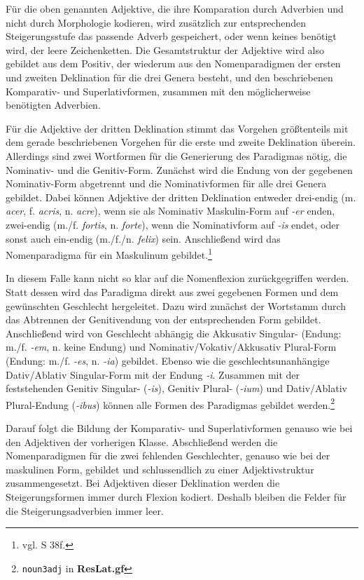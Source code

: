 Für die oben genannten Adjektive, die ihre Komparation durch Adverbien und nicht durch Morphologie kodieren, wird zusätzlich zur entsprechenden Steigerungsstufe das passende Adverb gespeichert, oder wenn keines benötigt wird, der leere Zeichenketten. Die Gesamtstruktur der Adjektive wird also gebildet aus dem Positiv, der wiederum aus den Nomenparadigmen der ersten und zweiten Deklination für die drei Genera besteht, und den beschriebenen Komparativ- und Superlativformen, zusammen mit den möglicherweise benötigten Adverbien.\par
Für die Adjektive der dritten Deklination stimmt das Vorgehen größtenteils mit dem gerade beschriebenen Vorgehen für die erste und zweite Deklination überein. Allerdings sind zwei Wortformen für die Generierung des Paradigmas nötig, die Nominativ- und die Genitiv-Form. Zunächst wird die Endung von der gegebenen Nominativ-Form abgetrennt und die Nominativformen für alle drei Genera gebildet. Dabei können Adjektive der dritten Deklination entweder drei-endig (m. \textit{acer}, f. \textit{acris}, n. \textit{acre}), wenn sie als Nominativ Maskulin-Form auf \textit{-er} enden, zwei-endig (m./f. \textit{fortis}, n. \textit{forte}), wenn die Nominativform auf \textit{-is} endet, oder sonst auch ein-endig (m./f./n. \textit{felix}) sein. Anschließend wird das Nomenparadigma für ein Maskulinum gebildet.\footnote{vgl. \cite{BAYER-LINDAUER1994} S 38f.} \par
In diesem Falle kann nicht so klar auf die Nomenflexion zurückgegriffen werden. Statt dessen wird das Paradigma direkt aus zwei gegebenen Formen und dem gewünschten Geschlecht hergeleitet. Dazu wird zunächst der Wortstamm durch das Abtrennen der Genitivendung von der entsprechenden Form gebildet. Anschließend wird von Geschlecht abhängig die Akkusativ Singular- (Endung: m./f. \textit{-em}, n. keine Endung) und Nominativ/Vokativ/Akkusativ Plural-Form (Endung: m./f. \textit{-es}, n. \textit{-ia}) gebildet. Ebenso wie die geschlechtsunanhängige Dativ/Ablativ Singular-Form mit der Endung \textit{-i}. Zusammen mit der feststehenden Genitiv Singular- (\textit{-is}), Genitiv Plural- (\textit{-ium}) und Dativ/Ablativ Plural-Endung (\textit{-ibus}) können alle Formen des Paradigmas gebildet werden.\footnote{\texttt{noun3adj} in \textbf{ResLat.gf}} \par
Darauf folgt die Bildung der Komparativ- und Superlativformen genauso wie bei den Adjektiven der vorherigen Klasse. Abschließend werden die Nomenparadigmen für die zwei fehlenden Geschlechter, genauso wie bei der maskulinen Form, gebildet und schlussendlich zu einer Adjektivstruktur zusammengesetzt. Bei Adjektiven dieser Deklination werden die Steigerungsformen immer durch Flexion kodiert. Deshalb bleiben die Felder für die Steigerungsadverbien immer leer.
